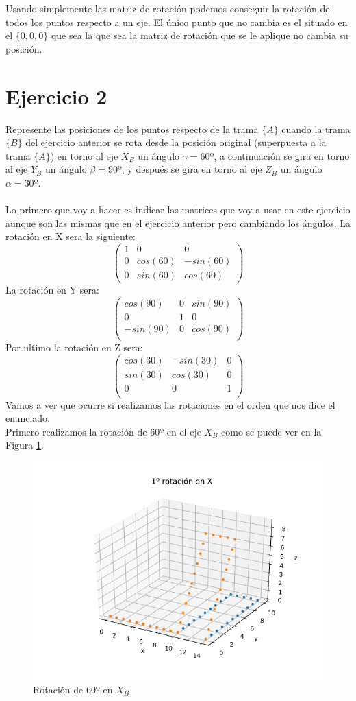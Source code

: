 \documentclass[12pt,a4paper]{report}
\begin{document}
Usando simplemente las matriz de rotación podemos conseguir la rotación de todos los puntos respecto a un eje. El único punto que no cambia es el situado en el $\{0,0,0\}$ que sea la que sea la matriz de rotación que se le aplique no cambia su posición.
\section*{Ejercicio 2}
Represente las posiciones de los puntos respecto de la trama $\{A\}$ cuando la
trama $\{B\}$ del ejercicio anterior se rota desde la posición original (superpuesta
a la trama $\{A\}$) en torno al eje $X_B$ un ángulo $\gamma = 60º$, a continuación se gira
en torno al eje $Y_B$ un ángulo $\beta = 90º$, y después se gira en torno al eje $Z_B$ un
ángulo $\alpha= 30º$.\\\\
Lo primero que voy a hacer es indicar las matrices que voy a usar en este ejercicio aunque son las mismas que en el ejercicio anterior pero cambiando los ángulos. La rotación en X sera la siguiente:
$$
\begin{pmatrix}
1 & 0 & 0 \\ 
0 & cos(60) & -sin(60) \\ 
0 & sin(60) & cos(60) 
\end{pmatrix}
$$
La rotación en Y sera:
$$
\begin{pmatrix} 
cos(90) & 0 & sin(90) \\  
0 & 1 & 0 \\  
-sin(90)& 0 & cos(90) \\  
\end{pmatrix}
$$
Por ultimo la rotación en Z sera:
$$
\begin{pmatrix} 
cos(30) & -sin(30) & 0 \\  
sin(30) & cos(30) & 0 \\  
0& 0 & 1 \\  
\end{pmatrix}
$$
Vamos a ver que ocurre si realizamos las rotaciones en el orden que nos dice el enunciado.\\
Primero realizamos la rotación de $60º$ en el eje $X_B$ como se puede ver en la Figura \ref{fig:eje2a_x}.
\begin{figure}[H]
	\centering
	\includegraphics[width=0.7\linewidth]{img/eje2a_x.png}
	\caption{Rotación de $60º$ en $X_B$}
	\label{fig:eje2a_x}
\end{figure}
\end{document}
